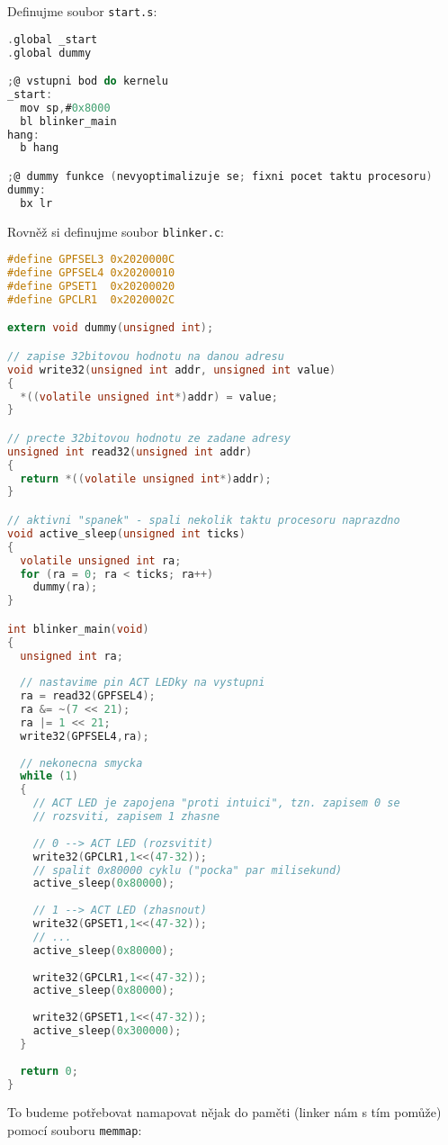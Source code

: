 \documentclass{article}
\begin{document}
Definujme soubor \texttt{start.s}:

\begin{lstlisting}[language=C]
.global _start
.global dummy

;@ vstupni bod do kernelu
_start:
  mov sp,#0x8000
  bl blinker_main
hang:
  b hang

;@ dummy funkce (nevyoptimalizuje se; fixni pocet taktu procesoru)
dummy:
  bx lr
\end{lstlisting}

Rovněž si definujme soubor \texttt{blinker.c}:

\begin{lstlisting}[language=C]
#define GPFSEL3 0x2020000C
#define GPFSEL4 0x20200010
#define GPSET1  0x20200020
#define GPCLR1  0x2020002C

extern void dummy(unsigned int);

// zapise 32bitovou hodnotu na danou adresu
void write32(unsigned int addr, unsigned int value)
{
  *((volatile unsigned int*)addr) = value;
}

// precte 32bitovou hodnotu ze zadane adresy
unsigned int read32(unsigned int addr)
{
  return *((volatile unsigned int*)addr);
}

// aktivni "spanek" - spali nekolik taktu procesoru naprazdno
void active_sleep(unsigned int ticks)
{
  volatile unsigned int ra;
  for (ra = 0; ra < ticks; ra++)
    dummy(ra);
}

int blinker_main(void)
{
  unsigned int ra;
	
  // nastavime pin ACT LEDky na vystupni
  ra = read32(GPFSEL4);
  ra &= ~(7 << 21);
  ra |= 1 << 21;
  write32(GPFSEL4,ra);
	
  // nekonecna smycka
  while (1)
  {
    // ACT LED je zapojena "proti intuici", tzn. zapisem 0 se
    // rozsviti, zapisem 1 zhasne
		
    // 0 --> ACT LED (rozsvitit)
    write32(GPCLR1,1<<(47-32));
    // spalit 0x80000 cyklu ("pocka" par milisekund)
    active_sleep(0x80000);
		
    // 1 --> ACT LED (zhasnout)
    write32(GPSET1,1<<(47-32));
    // ...
    active_sleep(0x80000);
		
    write32(GPCLR1,1<<(47-32));
    active_sleep(0x80000);
		
    write32(GPSET1,1<<(47-32));
    active_sleep(0x300000);
  }
	
  return 0;
}
\end{lstlisting}

To budeme potřebovat namapovat nějak do paměti (linker nám s tím pomůže) pomocí souboru \texttt{memmap}:
\end{document}
